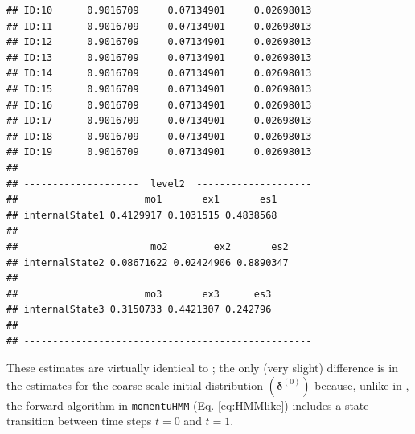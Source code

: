 \documentclass[12pt]{article}\usepackage[]{graphicx}\usepackage[]{xcolor}
\makeatletter
\newenvironment{kframe}{%
 \def\at@end@of@kframe{}%
 \ifinner\ifhmode%
  \def\at@end@of@kframe{\end{minipage}}%
  \begin{minipage}{\columnwidth}%
 \fi\fi%
 \def\FrameCommand##1{\hskip\@totalleftmargin \hskip-\fboxsep
 \colorbox{shadecolor}{##1}\hskip-\fboxsep
     \hskip-\linewidth \hskip-\@totalleftmargin \hskip\columnwidth}%
 \MakeFramed {\advance\hsize-\width
   \@totalleftmargin\z@ \linewidth\hsize
   \@setminipage}}%
 {\par\unskip\endMakeFramed%
 \at@end@of@kframe}
\newenvironment{knitrout}{}{} %
\makeatother
\begin{document}
\begin{knitrout}
\begin{kframe}
\begin{verbatim}
## ID:10      0.9016709     0.07134901     0.02698013
## ID:11      0.9016709     0.07134901     0.02698013
## ID:12      0.9016709     0.07134901     0.02698013
## ID:13      0.9016709     0.07134901     0.02698013
## ID:14      0.9016709     0.07134901     0.02698013
## ID:15      0.9016709     0.07134901     0.02698013
## ID:16      0.9016709     0.07134901     0.02698013
## ID:17      0.9016709     0.07134901     0.02698013
## ID:18      0.9016709     0.07134901     0.02698013
## ID:19      0.9016709     0.07134901     0.02698013
## 
## --------------------  level2  --------------------
##                      mo1       ex1       es1
## internalState1 0.4129917 0.1031515 0.4838568
## 
##                       mo2        ex2       es2
## internalState2 0.08671622 0.02424906 0.8890347
## 
##                      mo3       ex3      es3
## internalState3 0.3150733 0.4421307 0.242796
## 
## --------------------------------------------------
\end{verbatim}
\end{kframe}
\end{knitrout}
\noindent These estimates are virtually identical to \cite{Leos-BarajasEtAl2017}; the only (very slight) difference is in the estimates for the coarse-scale initial distribution $({\boldsymbol \delta}^{(0)})$ because, unlike in \cite{Leos-BarajasEtAl2017}, the forward algorithm in \verb|momentuHMM| (Eq. \ref{eq:HMMlike}) includes a state transition between time steps $t=0$ and $t=1$.
\end{document}
